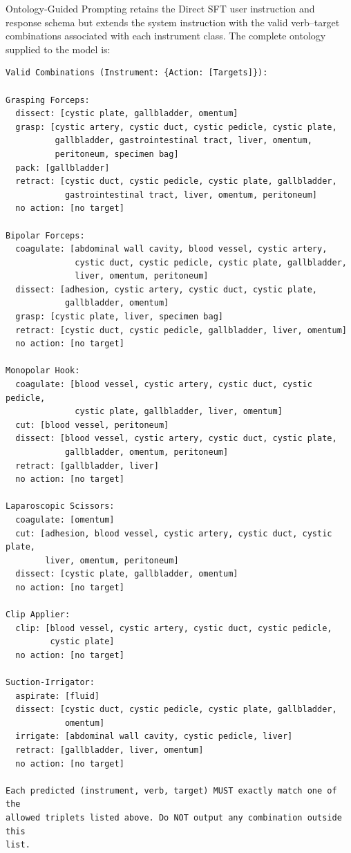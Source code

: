 Ontology-Guided Prompting retains the Direct SFT user instruction and response schema but extends the system instruction with the valid verb--target combinations associated with each instrument class. The complete ontology supplied to the model is:

\begin{lstlisting}[style=c5prompt]
Valid Combinations (Instrument: {Action: [Targets]}):

Grasping Forceps:
  dissect: [cystic plate, gallbladder, omentum]
  grasp: [cystic artery, cystic duct, cystic pedicle, cystic plate,
          gallbladder, gastrointestinal tract, liver, omentum,
          peritoneum, specimen bag]
  pack: [gallbladder]
  retract: [cystic duct, cystic pedicle, cystic plate, gallbladder,
            gastrointestinal tract, liver, omentum, peritoneum]
  no action: [no target]

Bipolar Forceps:
  coagulate: [abdominal wall cavity, blood vessel, cystic artery,
              cystic duct, cystic pedicle, cystic plate, gallbladder,
              liver, omentum, peritoneum]
  dissect: [adhesion, cystic artery, cystic duct, cystic plate,
            gallbladder, omentum]
  grasp: [cystic plate, liver, specimen bag]
  retract: [cystic duct, cystic pedicle, gallbladder, liver, omentum]
  no action: [no target]

Monopolar Hook:
  coagulate: [blood vessel, cystic artery, cystic duct, cystic pedicle,
              cystic plate, gallbladder, liver, omentum]
  cut: [blood vessel, peritoneum]
  dissect: [blood vessel, cystic artery, cystic duct, cystic plate,
            gallbladder, omentum, peritoneum]
  retract: [gallbladder, liver]
  no action: [no target]

Laparoscopic Scissors:
  coagulate: [omentum]
  cut: [adhesion, blood vessel, cystic artery, cystic duct, cystic plate,
        liver, omentum, peritoneum]
  dissect: [cystic plate, gallbladder, omentum]
  no action: [no target]

Clip Applier:
  clip: [blood vessel, cystic artery, cystic duct, cystic pedicle,
         cystic plate]
  no action: [no target]

Suction-Irrigator:
  aspirate: [fluid]
  dissect: [cystic duct, cystic pedicle, cystic plate, gallbladder,
            omentum]
  irrigate: [abdominal wall cavity, cystic pedicle, liver]
  retract: [gallbladder, liver, omentum]
  no action: [no target]

Each predicted (instrument, verb, target) MUST exactly match one of the
allowed triplets listed above. Do NOT output any combination outside this
list.
\end{lstlisting}

